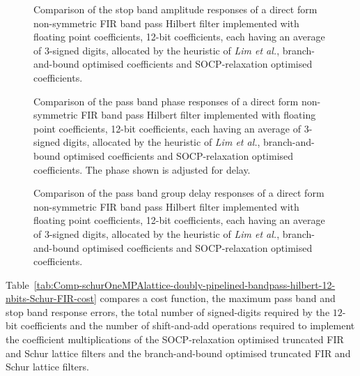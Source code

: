 \documentclass[a4paper,twoside,10pt,english]{article}
\newcommand{\DesignOfSchurLatticeFiltersPdfScale}{1}
\begin{document}
\begin{figure}
\centering
\scalebox{\DesignOfSchurLatticeFiltersPdfScale}{}
\caption{Comparison of the stop band amplitude responses of a direct form
  non-symmetric FIR band pass Hilbert filter implemented with floating point
  coefficients, 12-bit coefficients, each having an average of 3-signed digits,
  allocated by the heuristic of \emph{Lim et al.}, branch-and-bound optimised
  coefficients and SOCP-relaxation optimised coefficients.}
\label{fig:Comp-direct-FIR-non-symmetric-bandpass-hilbert-12-nbits-h-min-stop}
\end{figure}

\begin{figure}
\centering
\scalebox{\DesignOfSchurLatticeFiltersPdfScale}{}
\caption{Comparison of the pass band phase responses of a direct form
  non-symmetric FIR band pass Hilbert filter implemented with floating point
  coefficients, 12-bit coefficients, each having an average of 3-signed digits,
  allocated by the heuristic of \emph{Lim et al.}, branch-and-bound optimised
  coefficients and SOCP-relaxation optimised coefficients. The phase shown is
  adjusted for delay.}
\label{fig:Comp-direct-FIR-non-symmetric-bandpass-hilbert-12-nbits-h-min-phase}
\end{figure}

\begin{figure}
\centering
\scalebox{\DesignOfSchurLatticeFiltersPdfScale}{}
\caption{Comparison of the pass band group delay responses of a direct form
  non-symmetric FIR band pass Hilbert filter implemented with floating point
  coefficients, 12-bit coefficients, each having an average of 3-signed digits,
  allocated by the heuristic of \emph{Lim et al.}, branch-and-bound optimised
  coefficients and SOCP-relaxation optimised coefficients.}
\label{fig:Comp-direct-FIR-non-symmetric-bandpass-hilbert-12-nbits-h-min-delay}
\end{figure}

\clearpage

Table~\ref{tab:Comp-schurOneMPAlattice-doubly-pipelined-bandpass-hilbert-12-nbits-Schur-FIR-cost}
compares a cost function, the maximum pass band and stop band response errors,
the total number of signed-digits required by the $12$-bit coefficients and the number of
shift-and-add operations required to
implement the coefficient multiplications of the SOCP-relaxation optimised
truncated FIR and Schur lattice filters and the branch-and-bound optimised
truncated FIR and Schur lattice filters.
\end{document}
